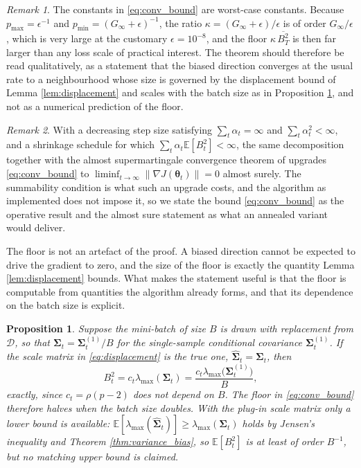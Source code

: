 \documentclass[a4paper,fleqn]{cas-sc}
\theoremstyle{plain}
\newtheorem{proposition}[theorem]{Proposition}
\theoremstyle{definition}
\theoremstyle{remark}
\newtheorem{remark}{Remark}
\newcommand{\rev}[1]{#1}
\newenvironment{revblock}{}{}
\newcommand{\E}{\mathbb{E}}
\begin{document}
\begin{remark}
\label{rem:constants}
The constants in \eqref{eq:conv_bound} are worst-case constants. Because $p_{\max}=\epsilon^{-1}$ and $p_{\min}=(G_\infty+\epsilon)^{-1}$, the ratio $\kappa=(G_\infty+\epsilon)/\epsilon$ is of order $G_\infty/\epsilon$, which is very large at the customary $\epsilon=10^{-8}$, and the floor $\kappa\,\overline{B^2_T}$ is then far larger than any loss scale of practical interest. The theorem should therefore be read qualitatively, as a statement that the biased direction converges at the usual rate to a neighbourhood whose size is governed by the displacement bound of Lemma \ref{lem:displacement} and scales with the batch size as in Proposition \ref{prop:batch}, and not as a numerical prediction of the floor.
\end{remark}

\begin{remark}
With a decreasing step size satisfying $\sum_t\alpha_t=\infty$ and $\sum_t\alpha^2_t<\infty$, and a shrinkage schedule for which $\sum_t\alpha_t\E[B^2_t]<\infty$, the same decomposition together with the almost supermartingale convergence theorem of \citet{robbins1971} upgrades \eqref{eq:conv_bound} to $\liminf_{t\to\infty}\|\nabla J(\bm\theta_t)\|=0$ almost surely. The summability condition is what such an upgrade costs, and the algorithm as implemented does not impose it, so we state the bound \eqref{eq:conv_bound} as the operative result and the almost sure statement as what an annealed variant would deliver.
\end{remark}

The floor is not an artefact of the proof. A biased direction cannot be expected to drive the gradient to zero, and the size of the floor is exactly the quantity Lemma \ref{lem:displacement} bounds. What makes the statement useful is that the floor is computable from quantities the algorithm already forms, and that its dependence on the batch size is explicit.

\begin{proposition}
\label{prop:batch}
Suppose the mini-batch of size $B$ is drawn with replacement from $\mathcal D$, so that $\bm\Sigma_t=\bm\Sigma^{(1)}_t/B$ for the single-sample conditional covariance $\bm\Sigma^{(1)}_t$. If the scale matrix in \eqref{eq:displacement} is the true one, $\widehat{\bm\Sigma}_t=\bm\Sigma_t$, then
\begin{equation}
B^2_t=c_t\lambda_{\max}(\bm\Sigma_t)=\frac{c_t\lambda_{\max}\bigl(\bm\Sigma^{(1)}_t\bigr)}{B},
\end{equation}
exactly, since $c_t=\rho(p-2)$ does not depend on $B$. The floor in \eqref{eq:conv_bound} therefore halves when the batch size doubles. With the plug-in scale matrix \rev{only a lower bound is available: $\E[\lambda_{\max}(\widehat{\bm\Sigma}_t)]\ge\lambda_{\max}(\bm\Sigma_t)$ holds by Jensen's inequality and Theorem \ref{thm:variance_bias}, so $\E[B^2_t]$ is at least of order $B^{-1}$, but no matching upper bound is claimed.}
\end{proposition}
\end{document}
